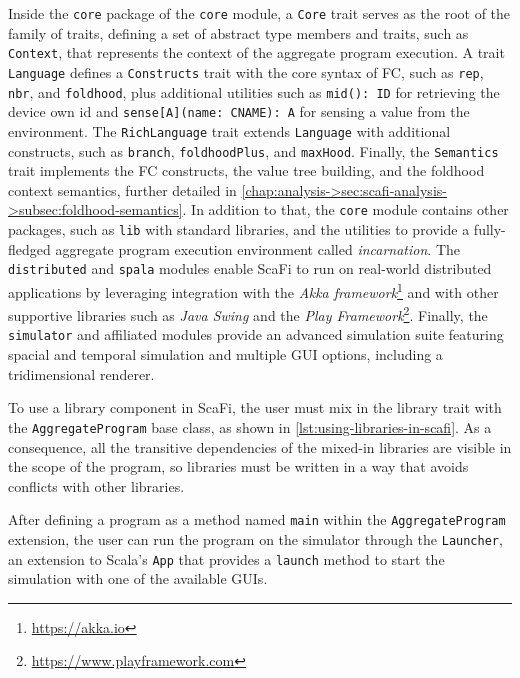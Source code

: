 Inside the \texttt{core} package of the \texttt{core} module, a \texttt{Core} trait serves as the root of the family of traits, defining a set of abstract type members and traits, such as \texttt{Context}, that represents the context of the aggregate program execution.
%
A trait \texttt{Language} defines a \texttt{Constructs} trait with the core syntax of \ac{FC}, such as \texttt{rep}, \texttt{nbr}, and \texttt{foldhood}, plus additional utilities such as \texttt{mid(): ID} for retrieving the device own id and \texttt{sense[A](name: CNAME): A} for sensing a value from the environment.
%
The \texttt{RichLanguage} trait extends \texttt{Language} with additional constructs, such as \texttt{branch}, \texttt{foldhoodPlus}, and \texttt{maxHood}.
%
Finally, the \texttt{Semantics} trait implements the \ac{FC} constructs, the value tree building, and the foldhood context semantics, further detailed in \cref{chap:analysis->sec:scafi-analysis->subsec:foldhood-semantics}.
%
In addition to that, the \texttt{core} module contains other packages, such as \texttt{lib} with standard libraries, and the utilities to provide a fully-fledged aggregate program execution environment called \textit{incarnation}.
%
The \texttt{distributed} and \texttt{spala} modules enable ScaFi to run on real-world distributed applications by leveraging integration with the \textit{Akka framework}\footnote{\url{https://akka.io}} and with other supportive libraries such as \textit{Java Swing} and the \textit{Play Framework}\footnote{\url{https://www.playframework.com}}.
%
Finally, the \texttt{simulator} and affiliated modules provide an advanced simulation suite featuring spacial and temporal simulation and multiple \ac{GUI} options, including a tridimensional renderer.

To use a library component in ScaFi, the user must mix in the library trait with the \texttt{AggregateProgram} base class, as shown in \cref{lst:using-libraries-in-scafi}.
%
As a consequence, all the transitive dependencies of the mixed-in libraries are visible in the scope of the program, so libraries must be written in a way that avoids conflicts with other libraries.



After defining a program as a method named \texttt{main} within the \texttt{AggregateProgram} extension, the user can run the program on the simulator through the \texttt{Launcher}, an extension to Scala's \texttt{App} that provides a \texttt{launch} method to start the simulation with one of the available \acp{GUI}.

